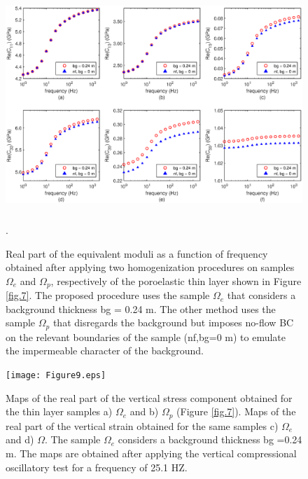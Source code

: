 \documentclass[draft]{agujournal2019}
\begin{document}
\begin{figure}[!ht]
\centering
        \includegraphics[width= 120mm, height=80mm]{Figure8.eps}
\caption{Real part of the equivalent moduli as a function of frequency obtained after applying two homogenization procedures on samples $\Omega_e$ and  $\Omega_p$, respectively of the poroelastic thin layer shown in Figure \ref{fig.7}. The proposed procedure uses the sample $\Omega_e$ that considers a background thickness bg = 0.24 m. The other method uses the sample $\Omega_p$ that disregards the background but imposes no-flow BC on the relevant boundaries of the sample (nf,bg=0 m) to emulate the impermeable character of the background.}. 

\label{fig.8}
\end{figure}

\begin{figure}[!ht]
\centering
        \texttt{[image: Figure9.eps]}
\caption{Maps of the real part of the vertical stress component obtained for the thin layer samples a) $\Omega_e$  and b) $\Omega_p$ (Figure \ref{fig.7}). Maps of the real part of the vertical strain  obtained for the same samples c) $\Omega_e$  and d) $\Omega$. 
The sample $\Omega_e$ considers a background thickness bg =0.24 m.
The maps are obtained after applying the vertical compressional oscillatory test for a frequency of 25.1 HZ.}
\label{fig.9}
\end{figure}
\end{document}
